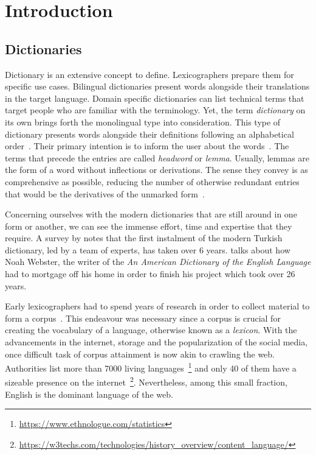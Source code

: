 \chapter{Introduction}\label{chap:introduction}%
\section{Dictionaries}%
\label{sec:dictionaries}
Dictionary is an extensive concept to define.
Lexicographers prepare them for specific use cases.
Bilingual dictionaries present words alongside their translations in the target language.
Domain specific dictionaries can list technical terms that target people who are familiar with the terminology.
Yet, the term \emph{dictionary} on its own brings forth the monolingual type into consideration.
This type of dictionary presents words alongside their definitions following an alphabetical order~\cite{sterkenburg_practical_2003}.
Their primary intention is to inform the user about the words~\cite{uzun_modern_2005}.
The terms that precede the entries are called \emph{headword} or \emph{lemma}.
Usually, lemmas are the form of a word without inflections or derivations.
The sense they convey is as comprehensive as possible, reducing the number of otherwise redundant entries that would be the derivatives of the unmarked form~\cite{ibrahim_usta_turkce_2006}.

Concerning ourselves with the modern dictionaries that are still around in one form or another, we can see the immense effort, time and expertise that they require.
A survey by \textcite{uzun_1945ten_1999} notes that the first instalment of the modern Turkish dictionary, led by a team of experts, has taken over 6 years.
\textcite{kendall_forgotten_2011} talks about how Noah Webster, the writer of the \emph{An American Dictionary of the English Language} had to mortgage off his home in order to finish his project which took over 26 years.

Early lexicographers had to spend years of research in order to collect material to form a corpus~\cite{uzun_1945ten_1999}.
This endeavour was necessary since a corpus is crucial for creating the vocabulary of a language, otherwise known as a \emph{lexicon}.
With the advancements in the internet, storage and the popularization of the social media, once difficult task of corpus attainment is now akin to crawling the web.
Authorities list more than 7000 living languages~\footnote{\url{https://www.ethnologue.com/statistics}} and only 40 of them have a sizeable presence on the internet~\footnote{\url{https://w3techs.com/technologies/history_overview/content_language/}}.
Nevertheless, among this small fraction, English is the dominant language of the web.

